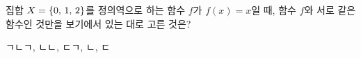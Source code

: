 \hspace*{2mm}\begin{minipage}[t]{\dimexpr\linewidth-2mm\relax}\vspace{0pt}
집합 $X=\{0,\mkern3mu 1,\mkern3mu 2\}$를 정의역으로 하는 함수 $f$가 $f(x)=x$일 때, 함수 $f$와 서로 같은 함수인 것만을 보기에서 있는 대로 고른 것은? 
\begin{choices32}{ㄱ}{ㄴ}{ㄱ, ㄴ}{ㄴ, ㄷ}{ㄱ, ㄴ, ㄷ}\end{choices32}\end{minipage}
